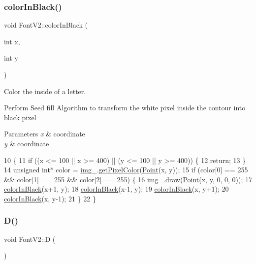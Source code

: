 \subsubsection{\texorpdfstring{color\+In\+Black()}{colorInBlack()}}
{\footnotesize\ttfamily void Font\+V2\+::color\+In\+Black (\begin{DoxyParamCaption}\item[{int}]{x,  }\item[{int}]{y }\end{DoxyParamCaption})}



Color the inside of a letter. 

Perform Seed fill Algorithm to transform the white pixel inside the contour into black pixel 
\begin{DoxyParams}{Parameters}
{\em x} & coordinate \\
\hline
{\em y} & coordinate \\
\hline
\end{DoxyParams}

\begin{DoxyCode}
10                                       \{
11     \textcolor{keywordflow}{if} ((x <= 100 || x >= 400) || (y <= 100 || y >= 400)) \{
12         \textcolor{keywordflow}{return};
13     \}
14     \textcolor{keywordtype}{unsigned} \textcolor{keywordtype}{int}* color = \mbox{\hyperlink{class_font_v1_a00569e3e3c4b70f437b63f396f735fb0}{img\_}}.\mbox{\hyperlink{class_image_adb23176701dae47479d4919f55f3aec5}{getPixelColor}}(\mbox{\hyperlink{class_point}{Point}}(x, y));
15     \textcolor{keywordflow}{if} (color[0] == 255 \&\& color[1] == 255 \&\& color[2] == 255) \{
16         \mbox{\hyperlink{class_font_v1_a00569e3e3c4b70f437b63f396f735fb0}{img\_}}.\mbox{\hyperlink{class_image_a8d162f3cab956131d58708c09aa560b0}{draw}}(\mbox{\hyperlink{class_point}{Point}}(x, y, 0, 0, 0));
17         \mbox{\hyperlink{class_font_v2_a04f2501961bc286ce70fbb6a840b0e8a}{colorInBlack}}(x+1, y);
18         \mbox{\hyperlink{class_font_v2_a04f2501961bc286ce70fbb6a840b0e8a}{colorInBlack}}(x-1, y);
19         \mbox{\hyperlink{class_font_v2_a04f2501961bc286ce70fbb6a840b0e8a}{colorInBlack}}(x, y+1);
20         \mbox{\hyperlink{class_font_v2_a04f2501961bc286ce70fbb6a840b0e8a}{colorInBlack}}(x, y-1);
21     \}
22 \}
\end{DoxyCode}
\mbox{\label{class_font_v2_ab6a088abff91bacc1096b6008296142b}} 
\subsubsection{\texorpdfstring{D()}{D()}}
{\footnotesize\ttfamily void Font\+V2\+::D (\begin{DoxyParamCaption}{ }\end{DoxyParamCaption})}



